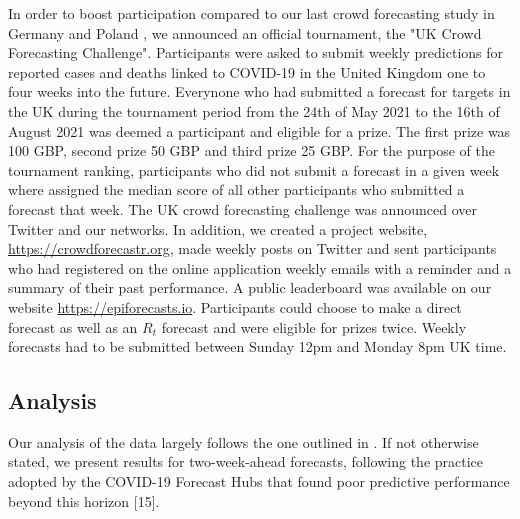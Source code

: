 \documentclass[10pt,a4paper,twocolumn]{article}
\begin{document}
In order to boost participation compared to our last crowd forecasting study in Germany and Poland \citep{bosseComparingHumanModelbased2022}, we announced an official tournament, the "UK Crowd Forecasting Challenge". Participants were asked to submit weekly predictions for reported cases and deaths linked to COVID-19 in the United Kingdom one to four weeks into the future. Everynone who had submitted a forecast for targets in the UK during the tournament period from the 24th of May 2021 to the 16th of August 2021 was deemed a participant and eligible for a prize. The first prize was 100 GBP, second prize 50 GBP and third prize 25 GBP. For the purpose of the tournament ranking, participants who did not submit a forecast in a given week where assigned the median score of all other participants who submitted a forecast that week. The UK crowd forecasting challenge was announced over Twitter and our networks. 
In addition, we created a project website, \url{https://crowdforecastr.org}, made weekly posts on Twitter and sent participants who had registered on the online application weekly emails with a reminder and a summary of their past performance. A public leaderboard was available on our website \url{https://epiforecasts.io}. Participants could choose to make a direct forecast as well as an $R_t$ forecast and were eligible for prizes twice. Weekly forecasts had to be submitted between Sunday 12pm and Monday 8pm UK time. 


\subsection*{Analysis}

Our analysis of the data largely follows the one outlined in \citet{bosseComparingHumanModelbased2022}. If not otherwise stated, we present results for two-week-ahead forecasts, following the practice adopted by the COVID-19 Forecast Hubs that found poor predictive performance beyond this horizon [15]. 
\end{document}
